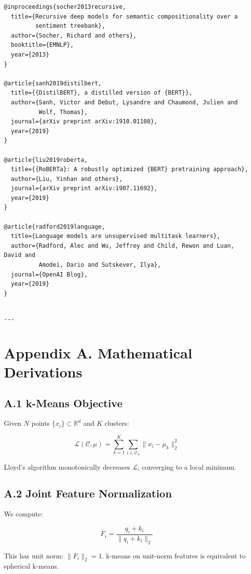 \begin{lstlisting}
@inproceedings{socher2013recursive,
  title={Recursive deep models for semantic compositionality over a 
         sentiment treebank},
  author={Socher, Richard and others},
  booktitle={EMNLP},
  year={2013}
}

@article{sanh2019distilbert,
  title={{DistilBERT}, a distilled version of {BERT}},
  author={Sanh, Victor and Debut, Lysandre and Chaumond, Julien and 
          Wolf, Thomas},
  journal={arXiv preprint arXiv:1910.01108},
  year={2019}
}

@article{liu2019roberta,
  title={{RoBERTa}: A robustly optimized {BERT} pretraining approach},
  author={Liu, Yinhan and others},
  journal={arXiv preprint arXiv:1907.11692},
  year={2019}
}

@article{radford2019language,
  title={Language models are unsupervised multitask learners},
  author={Radford, Alec and Wu, Jeffrey and Child, Rewon and Luan, David and 
          Amodei, Dario and Sutskever, Ilya},
  journal={OpenAI Blog},
  year={2019}
}
\end{lstlisting}
\begin{lstlisting}

---
\end{lstlisting}


\section{Appendix A. Mathematical Derivations}

\subsection{A.1 k-Means Objective}

Given $N$ points $\{x_i\} \subset \mathbb{R}^d$ and $K$ clusters:

\[
\mathcal{L}(\mathcal{C}, \mu) = \sum_{k=1}^{K} \sum_{i \in \mathcal{C}_k} \|x_i - \mu_k\|_2^2
\tag{A.1}
\]

Lloyd's algorithm monotonically decreases $\mathcal{L}$, converging to a 
local minimum.

\subsection{A.2 Joint Feature Normalization}

We compute:

\[
F_i = \frac{q_i + k_i}{\|q_i + k_i\|_2}
\tag{A.2}
\]

This has unit norm: $\|F_i\|_2 = 1$. k-means on unit-norm features is 
equivalent to spherical k-means.

